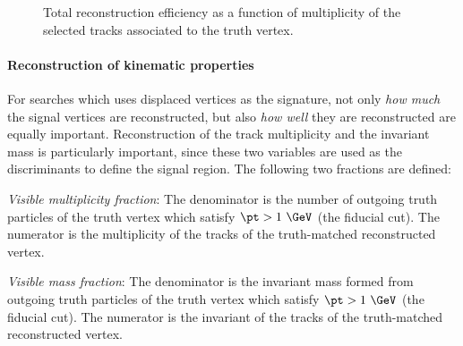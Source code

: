 \begin{figure}[t]
\begin{center}
\caption{Total reconstruction efficiency as a function of multiplicity of the selected tracks associated to the truth vertex.}
\label{fig:effMult}
\end{center}
\end{figure}


\paragraph{Reconstruction of kinematic properties}
For searches which uses displaced vertices as the signature, not only \emph{how much} the signal vertices are reconstructed, but also \emph{how well} they are reconstructed are equally important. Reconstruction of the track multiplicity and the invariant mass is particularly important, since these two variables are used as the discriminants to define the signal region. The following two fractions are defined:

\begin{description}
\item{\emph{Visible multiplicity fraction}}: The denominator is the number of outgoing truth particles of the truth vertex which satisfy $\pt>1~\GeV$ (the fiducial cut). The numerator is the multiplicity of the tracks of the truth-matched reconstructed vertex.
\item{\emph{Visible mass fraction}}: The denominator is the invariant mass formed from outgoing truth particles of the truth vertex which satisfy $\pt>1~\GeV$ (the fiducial cut). The numerator is the invariant of the tracks of the truth-matched reconstructed vertex.
\end{description}

